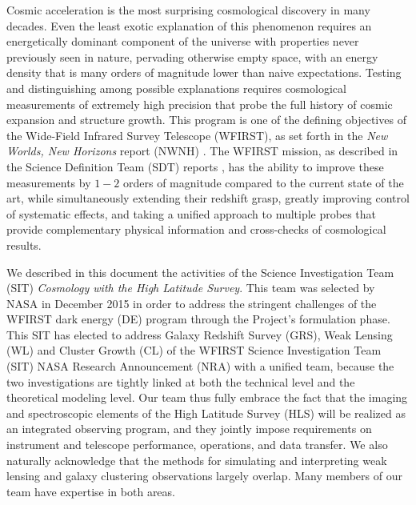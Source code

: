 %
%

\begin{summary}

Cosmic acceleration is the most surprising cosmological discovery in
many decades.  Even the least exotic explanation of this phenomenon
requires an energetically dominant component of the universe with
properties never previously seen in nature, pervading otherwise
empty space, with an energy density that is many orders of magnitude
lower than naive expectations. Testing and distinguishing among possible  explanations requires cosmological
measurements of extremely high precision that probe the full history of
cosmic expansion and structure growth.
This program is one of the defining objectives of the Wide-Field
Infrared Survey Telescope (WFIRST), as set forth in the {\it New Worlds, New Horizons}
report (NWNH) \cite{NWNH2010}.  The WFIRST mission, as described in the Science
Definition Team (SDT) reports \citep[hereafter SDT13 and SDT15 respectively]{Spergel2013, Spergel2015}, has the ability to improve these
measurements by $1-2$ orders of magnitude compared to the current
state of the art, while simultaneously extending their redshift grasp,
greatly improving control of systematic effects, and taking a unified
approach to multiple probes that provide complementary physical information
and cross-checks of cosmological results.

We described in this document the activities of the Science Investigation Team (SIT) \emph{Cosmology with the High Latitude Survey}.
This team was selected by NASA in December 2015 in order to address
the stringent challenges of the WFIRST dark energy (DE) program through the
Project's formulation phase.  This SIT has elected to address Galaxy Redshift Survey (GRS), Weak Lensing (WL) and Cluster Growth (CL) of the WFIRST Science Investigation Team (SIT) NASA Research Announcement (NRA) with a unified team, because the two investigations are tightly linked at both
the technical level and the theoretical modeling level. Our team thus fully embrace
the fact that the imaging and spectroscopic elements of the High Latitude Survey
(HLS) will be realized as an integrated observing program, and they jointly
impose requirements on instrument and telescope performance, operations, and
data transfer. We also naturally acknowledge that the methods for simulating and interpreting weak lensing and
galaxy clustering observations largely overlap. Many members of our team
have expertise in both areas.


\end{summary}
